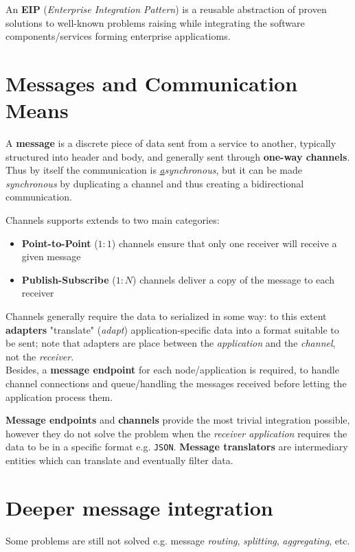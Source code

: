 An \textbf{EIP} (\textit{Enterprise Integration Pattern}) is a reusable abstraction of proven solutions to well-known problems raising while integrating the software components/services forming enterprise applicatioms.

\section{Messages and Communication Means}
A \textbf{message} is a discrete piece of data sent from a service to another, typically structured into header and body,
and generally sent through \textbf{one-way channels}.
Thus by itself the communication is \textit{\underline{a}synchronous}, but it can be made \textit{synchronous} by duplicating a channel and thus creating a bidirectional communication.

Channels supports extends to two main categories:
\begin{itemize}
   \item \textbf{Point-to-Point} ($1:1$) channels ensure that only one receiver will receive a given message
   \item \textbf{Publish-Subscribe} ($1:N$) channels deliver a copy of the message to each receiver
\end{itemize}

Channels generally require the data to serialized in some way: 
to this extent \textbf{adapters} "translate" (\textit{adapt}) application-specific data into a format suitable to be sent;
note that adapters are place between the \textit{application} and the \textit{channel}, not the \textit{receiver}.\\
Besides, a \textbf{message endpoint} for each node/application is required,
to handle channel connections and queue/handling the messages received before letting the application process them.\nl

\textbf{Message endpoints} and \textbf{channels} provide the most trivial integration possible,
however they do not solve the problem when the \textit{receiver application} requires the data to be in a specific format e.g. \texttt{JSON}.
\textbf{Message translators} are intermediary entities which can translate and eventually filter data.

\section{Deeper message integration}
Some problems are still not solved e.g. message \textit{routing}, \textit{splitting}, \textit{aggregating}, etc.\nl

